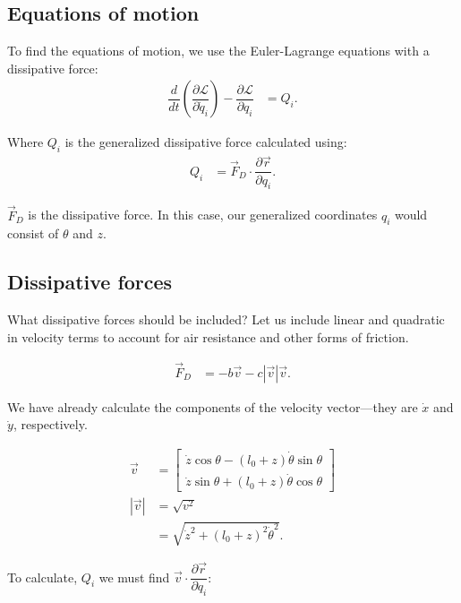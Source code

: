 \documentclass[12pt,a4paper,portrait]{article}
\begin{document}
\subsection{Equations of motion}
To find the equations of motion, we use the Euler-Lagrange equations with a dissipative force:
\begin{align}
	\dfrac{d}{dt}\left(\dfrac{\partial \mathcal{L}}{\partial \dot{q}_i}\right) - \dfrac{\partial \mathcal{L}}{\partial q_i} &= Q_i. \label{ELD}
\end{align}

Where $Q_i$ is the generalized dissipative force calculated using:
\begin{align*}
	Q_i &= \vec{F}_{D} \cdot \dfrac{\partial \vec{r}}{\partial q_i}.
\end{align*}

$\vec{F}_D$ is the dissipative force. In this case, our generalized coordinates $q_i$ would consist of $\theta$ and $z$. 

\subsection{Dissipative forces}
What dissipative forces should be included? Let us include linear and quadratic in velocity terms to account for air resistance and other forms of friction. 

\begin{align*}
	\vec{F}_D &= -b\vec{v} - c|\vec{v}|\vec{v}.
\end{align*}

We have already calculate the components of the velocity vector---they are $\dot{x}$ and $\dot{y}$, respectively. 

\begin{align*}
	\vec{v} &= \begin{bmatrix}
		\dot{z}\cos{\theta} - (l_0+z)\dot{\theta}\sin{\theta} \\
		\dot{z}\sin{\theta} + (l_0+z)\dot{\theta}\cos{\theta}
	\end{bmatrix}\\
	|\vec{v}| &= \sqrt{v^2}\\
	&= \sqrt{\dot{z}^2+(l_0+z)^2\dot{\theta}^2}.
\end{align*}

To calculate, $Q_i$ we must find $\vec{v} \cdot \dfrac{\partial \vec{r}}{\partial q_i}$:
\end{document}
